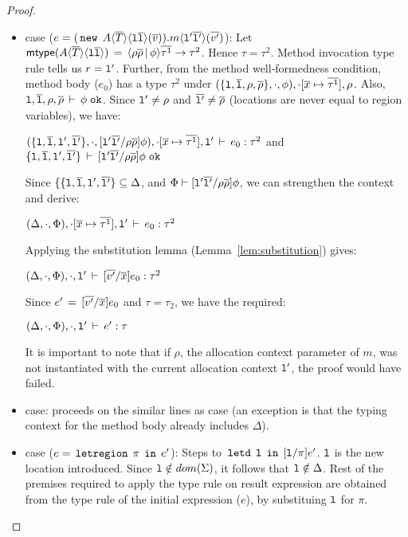 \begin{proof}
\begin{itemize}
    \item {} case ($e = (\,{\tt new}\,\; A\langle \overline{T} \rangle
    \langle \mathtt{l}\overline{\mathtt{l}} \rangle(\overline{v})).m\langle \mathtt{l}'\overline{\mathtt{l}'} \rangle
    (\overline{v'})$): Let ${\sf mtype}(A\langle \overline{T} \rangle\langle \mathtt{l}\overline{\mathtt{l}} \rangle) 
    \,=\, \langle \rho\overline{\rho} \,|\, \phi \rangle\overline{\tau^1}\rightarrow 
    \tau^2$. Hence $\tau = \tau^2$. Method invocation type rule tells
    us $r = \mathtt{l}'$. Further, from the method well-formedness
    condition, method body ($e_0$) has a type $\tau^2$ under
    $(\{\mathtt{l},\overline{\mathtt{l}},\rho,\overline{\rho}\},\cdot,\phi),\cdot[\overline{x} \mapsto
    \overline{\tau^1}], \rho$. Also,
    $\mathtt{l},\overline{\mathtt{l}},\rho,\overline{\rho}\,\vdash\,\phi \; \texttt{ok}$. Since $\mathtt{l}' \neq \rho$
    and $\overline{\mathtt{l}'} \neq \overline{\rho}$ (locations are never equal to
    region variables), we have:
    \begin{center}
    $(\{\mathtt{l},\overline{\mathtt{l}},\mathtt{l}',\overline{\mathtt{l}'}\},\cdot,
      [\mathtt{l}'\overline{\mathtt{l}'}/\rho\overline{\rho}]\phi),\cdot[\overline{x}
      \mapsto \overline{\tau^1}],\mathtt{l}'\,\vdash\,e_0:\tau^2$ and
    $\{\mathtt{l},\overline{\mathtt{l}},\mathtt{l}',\overline{\mathtt{l}'}\}\,\vdash\,[\mathtt{l}'\overline{\mathtt{l}'}/\rho\overline{\rho}]\phi \; \texttt{ok}$
    \end{center}
    Since $\{\{\mathtt{l},\overline{\mathtt{l}},\mathtt{l}',\overline{\mathtt{l}'}\} \subseteq \Delta$, and
    $\Phi \vdash [\mathtt{l}'\overline{\mathtt{l}'}/\rho\overline{\rho}]\phi$, we can strengthen
    the context and derive:
    \begin{center}
      $(\Delta,\cdot,\Phi),\cdot[\overline{x} \mapsto
      \overline{\tau^1}], \mathtt{l}'\,\vdash\,e_0:\tau^2$
    \end{center}
    Applying the substitution lemma (Lemma~\ref{lem:substitution})
    gives:
    \begin{center}
      $(\Delta,\cdot,\Phi),\cdot,
        \mathtt{l}'\,\vdash\,[\overline{v'}/\overline{x}]e_0:\tau^2$
    \end{center}
    Since $e' \,=\, [\overline{v'}/\overline{x}]e_0$ and $\tau = \tau_2$, we
    have the required:
    \begin{center}
      $(\Delta,\cdot,\Phi),\cdot, \mathtt{l}'\,\vdash\,e':\tau$
    \end{center}
    It is important to note that if $\rho$, the allocation context
    parameter of $m$, was not instantiated with the current allocation
    context $\mathtt{l}'$, the proof would have failed.
    \item {} case: proceeds on the similar lines as
     case (an exception is that the typing context
    for the method body already includes $\Delta$).

    \item {} case ($e = \,{\tt letregion}\,\;\pi\;\,{\tt in}\,\;e'$):
    Steps to $\,{\tt letd}\,\;\mathtt{l}\;\,{\tt in}\,\;[\mathtt{l}/\pi]e'$.
    $\mathtt{l}$ is the new location introduced. Since $\mathtt{l} \notin
    dom(\Sigma)$, it follows that $\mathtt{l} \notin \Delta$. Rest of the
    premises required to apply the  type rule on result
    expression are obtained from the  type rule of the
    initial expression ($e$), by substituing $\mathtt{l}$ for $\pi$.


\end{itemize}
\end{proof}
